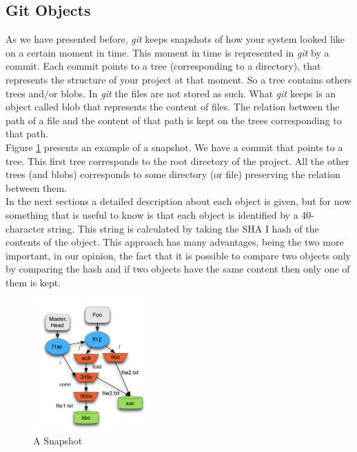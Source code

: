 \subsection{Git Objects}
As we have presented before, \emph{git} keeps snapshots of how your system
looked like on a certain moment in time. This moment in time is
represented in \emph{git} by a commit. Each commit points to a tree
(corresponding to a directory), that
represents the structure of your project at that moment. So a tree
contains others trees and/or blobs. In \emph{git} the files are not stored as such. 
What \emph{git} keeps is an object called blob that represents the content of files. The
relation between the path of a file and the content of that path 
is kept on the trees corresponding to that path. \\

Figure \ref{fig:snapshot} presents an example of a snapshot. We
have a commit that points to a tree. This first tree corresponds to
the root directory of the project. All the other trees (and blobs)
corresponds to some directory (or file) preserving the relation
between them. \\

In the next sections a detailed description about each object is
given, but for now something that is useful to know is that each
object is identified by a 40-character string. This string is
calculated by taking the SHA I hash of the contents of the object.
This approach has many advantages, being the two more important, in our
opinion, the
fact that it is possible to compare two objects only by comparing the hash and
if two objects have the same content then only one of them is kept.

\begin{figure}[!h]
   \centering
   \includegraphics[width=0.4\textwidth]{images/object_assoc.png}
   \caption{A Snapshot}
   \label{fig:snapshot}
\end{figure}

